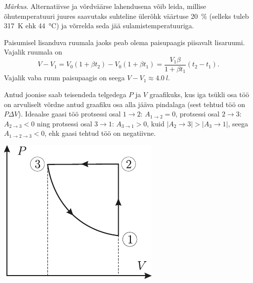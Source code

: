 \documentclass[10pt, twoside]{article}
\begin{document}
{\emph{Märkus}. Alternatiivse ja võrdväärse lahendusena võib leida, millise õhutemperatuuri juures saavutaks suhteline ülerõhk väärtuse \SI{20}{\%} (selleks tuleb \SI{317}{K} ehk \SI{44}{\degreeCelsius}) ja võrrelda seda jää sulamistemperatuuriga.
\probend
\bigskip


\solu
Paisumisel lisanduva ruumala jaoks peab olema paisupaagis piisavalt lisaruumi. Vajalik ruumala on
\[
V-V_{1}=V_{0}\left(1+\beta t_{2}\right)-V_{0}\left(1+\beta t_{1}\right)=\frac{V_{1} \beta}{1+\beta t_{1}}\left(t_{2}-t_{1}\right).
\]
Vajalik vaba ruum paisupaagis on seega $V - V_1 \approx \SI{4,0}{l}$.
\probend
\bigskip


\solu
Antud joonise saab teisendeda telgedega $P$ ja $V$ graafikuks, kus iga tsükli osa töö on arvuliselt võrdne antud graafiku osa alla jääva pindalaga (sest tehtud töö on $P\Delta V$). Ideaalse gaasi töö protsessi osal $1 \rightarrow 2$: $A_{1\rightarrow 2} = 0$, protsessi osal $2 \rightarrow 3$: $A_{2\rightarrow 3} < 0$ ning protsessi osal $3 \rightarrow 1$: $A_{3\rightarrow 1} > 0$, kuid $|A_2\rightarrow 3| > |A_3\rightarrow 1|$, seega $A_{1\rightarrow 2\rightarrow 3} < 0$, ehk gaasi tehtud töö on negatiivne.

\begin{center}
	\includegraphics[width=0.4\linewidth]{2006-v2g-02-lah}
\end{center}
\probend
\bigskip


}
\end{document}
